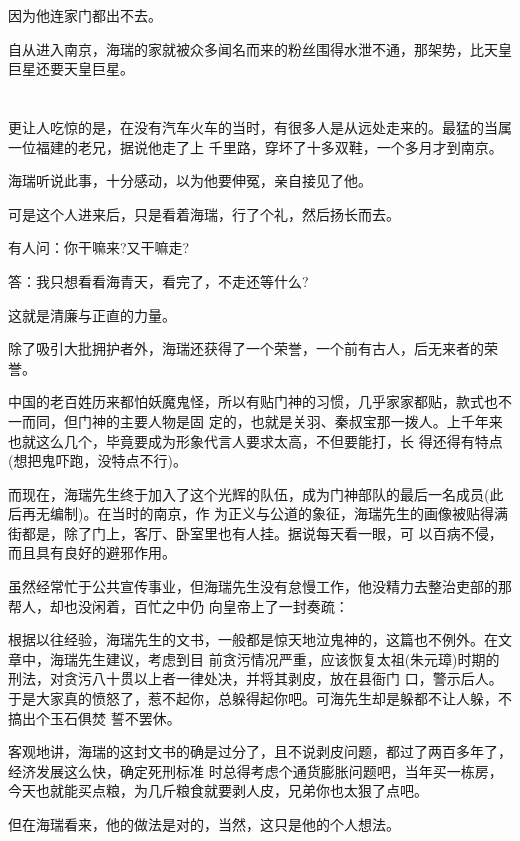 \documentclass[11pt,a4paper,onecolumn]{article}
\begin{document}
因为他连家门都出不去。

自从进入南京，海瑞的家就被众多闻名而来的粉丝围得水泄不通，那架势，比天皇巨星还要天皇巨星。

\section[\thesection]{}

更让人吃惊的是，在没有汽车火车的当时，有很多人是从远处走来的。最猛的当属一位福建的老兄，据说他走了上
千里路，穿坏了十多双鞋，一个多月才到南京。

海瑞听说此事，十分感动，以为他要伸冤，亲自接见了他。

可是这个人进来后，只是看着海瑞，行了个礼，然后扬长而去。

有人问：你干嘛来?又干嘛走?

答：我只想看看海青天，看完了，不走还等什么?

这就是清廉与正直的力量。

除了吸引大批拥护者外，海瑞还获得了一个荣誉，一个前有古人，后无来者的荣誉。

中国的老百姓历来都怕妖魔鬼怪，所以有贴门神的习惯，几乎家家都贴，款式也不一而同，但门神的主要人物是固
定的，也就是关羽、秦叔宝那一拨人。上千年来也就这么几个，毕竟要成为形象代言人要求太高，不但要能打，长
得还得有特点(想把鬼吓跑，没特点不行)。

而现在，海瑞先生终于加入了这个光辉的队伍，成为门神部队的最后一名成员(此后再无编制)。在当时的南京，作
为正义与公道的象征，海瑞先生的画像被贴得满街都是，除了门上，客厅、卧室里也有人挂。据说每天看一眼，可
以百病不侵，而且具有良好的避邪作用。

虽然经常忙于公共宣传事业，但海瑞先生没有怠慢工作，他没精力去整治吏部的那帮人，却也没闲着，百忙之中仍
向皇帝上了一封奏疏：

根据以往经验，海瑞先生的文书，一般都是惊天地泣鬼神的，这篇也不例外。在文章中，海瑞先生建议，考虑到目
前贪污情况严重，应该恢复太祖(朱元璋)时期的刑法，对贪污八十贯以上者一律处决，并将其剥皮，放在县衙门
口，警示后人。于是大家真的愤怒了，惹不起你，总躲得起你吧。可海先生却是躲都不让人躲，不搞出个玉石俱焚
誓不罢休。

客观地讲，海瑞的这封文书的确是过分了，且不说剥皮问题，都过了两百多年了，经济发展这么快，确定死刑标准
时总得考虑个通货膨胀问题吧，当年买一栋房，今天也就能买点粮，为几斤粮食就要剥人皮，兄弟你也太狠了点吧。

但在海瑞看来，他的做法是对的，当然，这只是他的个人想法。

\section[\thesection]{}
\end{document}
